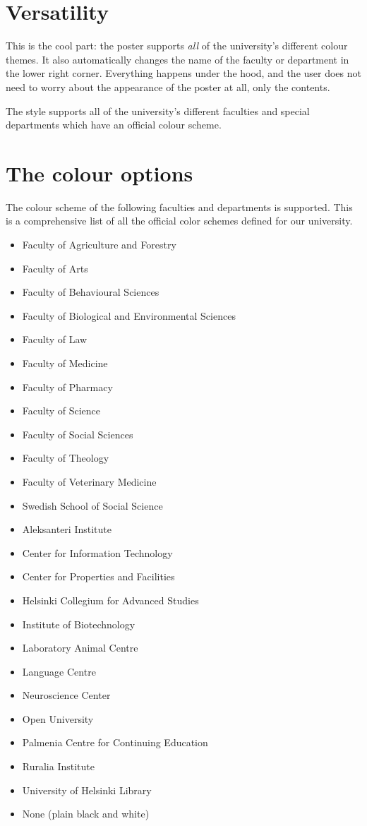 \documentclass[a0paper,smallertitle]{test1}
\begin{document}
\section*{Versatility}
This is the cool part: the poster supports \emph{all} of the university's different colour themes. It also automatically changes the name of the faculty or department in the lower right corner. Everything happens under the hood, and the user does not need to worry about the appearance of the poster at all, only the contents.

The style supports all of the university's different faculties and special departments which have an official colour scheme.


\section*{The colour options}

The colour scheme of the following faculties and departments is supported. This is a comprehensive list of all the official color schemes defined for our university.

\begin{itemize}
    \item Faculty of Agriculture and Forestry 
    \item Faculty of Arts 
    \item Faculty of Behavioural Sciences 
    \item Faculty of Biological and Environmental Sciences 
    \item Faculty of Law 
    \item Faculty of Medicine 
    \item Faculty of Pharmacy 
    \item Faculty of Science 
    \item Faculty of Social Sciences 
    \item Faculty of Theology 
    \item Faculty of Veterinary Medicine 
    \item Swedish School of Social Science
    \item Aleksanteri Institute
    \item Center for Information Technology
    \item Center for Properties and Facilities
    \item Helsinki Collegium for Advanced Studies
    \item Institute of Biotechnology
    \item Laboratory Animal Centre
    \item Language Centre
    \item Neuroscience Center
    \item Open University
    \item Palmenia Centre for Continuing Education
    \item Ruralia Institute
    \item University of Helsinki Library
    \item None (plain black and white)
\end{itemize}
\end{document}
